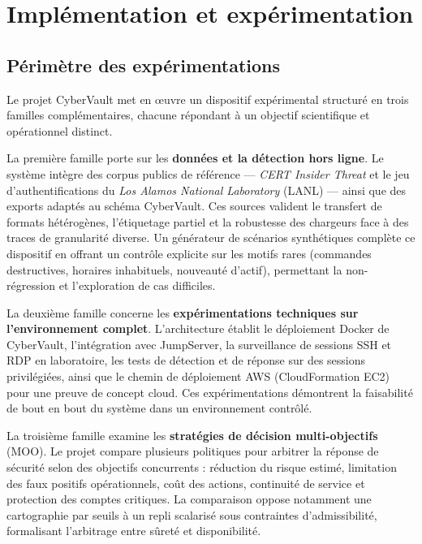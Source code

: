 \documentclass[11pt,a4paper,oneside]{report}
\theoremstyle{definition}
\theoremstyle{plain}
\begin{document}
\chapter{Implémentation et expérimentation}
\label{chap:impl}

\section{Périmètre des expérimentations}
\label{sec:experiments-scope}

Le projet CyberVault met en œuvre un dispositif expérimental structuré en trois
familles complémentaires, chacune répondant à un objectif scientifique et
opérationnel distinct.

La première famille porte sur les \textbf{données et la détection hors ligne}.
Le système intègre des corpus publics de référence --- \emph{CERT Insider Threat}
et le jeu d'authentifications du \emph{Los Alamos National Laboratory} (LANL)
--- ainsi que des exports adaptés au schéma CyberVault. Ces sources valident
le transfert de formats hétérogènes, l'étiquetage partiel et la robustesse des
chargeurs face à des traces de granularité diverse. Un générateur de scénarios
synthétiques complète ce dispositif en offrant un contrôle explicite sur les
motifs rares (commandes destructives, horaires inhabituels, nouveauté d'actif),
permettant la non-régression et l'exploration de cas difficiles.

La deuxième famille concerne les \textbf{expérimentations techniques sur
l'environnement complet}. L'architecture établit le déploiement Docker de
CyberVault, l'intégration avec JumpServer, la surveillance de sessions SSH et
RDP en laboratoire, les tests de détection et de réponse sur des sessions
privilégiées, ainsi que le chemin de déploiement AWS (CloudFormation EC2) pour
une preuve de concept cloud. Ces expérimentations démontrent la faisabilité de
bout en bout du système dans un environnement contrôlé.

La troisième famille examine les \textbf{stratégies de décision
multi-objectifs} (MOO). Le projet compare plusieurs politiques pour arbitrer la
réponse de sécurité selon des objectifs concurrents : réduction du risque
estimé, limitation des faux positifs opérationnels, coût des actions,
continuité de service et protection des comptes critiques. La comparaison
oppose notamment une cartographie par seuils à un repli scalarisé sous
contraintes d'admissibilité, formalisant l'arbitrage entre sûreté et
disponibilité.
\end{document}
